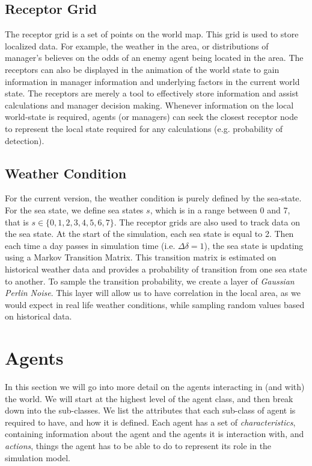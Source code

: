 \documentclass{article}
\begin{document}
\subsection{Receptor Grid}
The receptor grid is a set of points on the world map. This grid is used to store localized data. For example, the weather in the area, or distributions of manager's believes on the odds of an enemy agent being located in the area. The receptors can also be displayed in the animation of the world state to gain information in manager information and underlying factors in the current world state. The receptors are merely a tool to effectively store information and assist calculations and manager decision making. Whenever information on the local world-state is required, agents (or managers) can seek the closest receptor node  to represent the local state required for any calculations (e.g. probability of detection). 

\subsection{Weather Condition}
For the current version, the weather condition is purely defined by the sea-state. For the sea state, we define sea states $s$, which is in a range between 0 and 7, that is $s \in \{0, 1, 2, 3, 4, 5, 6, 7 \}$. The receptor grids are also used to track data on the sea state. At the start of the simulation, each sea state is equal to 2. Then each time a day passes in simulation time (i.e. $\Delta \delta = 1$), the sea state is updating using a Markov Transition Matrix. This transition matrix is estimated on historical weather data and provides a probability of transition from one sea state to another. To sample the transition probability, we create a layer of \textit{Gaussian Perlin Noise}. This layer will allow us to have correlation in the local area, as we would expect in real life weather conditions, while sampling random values based on historical data. 

\section{Agents}
In this section we will go into more detail on the agents interacting in (and with) the world. We will start at the highest level of the agent class, and then break down into the sub-classes. We list the attributes that each sub-class of agent is required to have, and how it is defined. Each agent has a set of \textit{characteristics}, containing information about the agent and the agents it is interaction with, and \textit{actions}, things the agent has to be able to do to represent its role in the simulation model.
\end{document}

